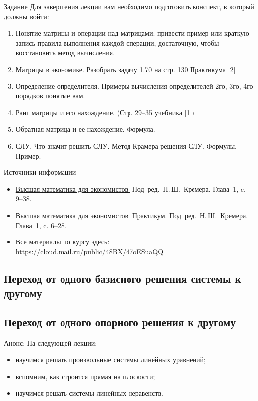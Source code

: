 \documentclass[unicode,11pt,notheorems]{beamer}
\begin{document}
\begin{frame}{Задание}
Для завершения лекции вам необходимо подготовить конспект, в который должны войти:
	\begin{enumerate}
		\item 
			Понятие матрицы и операции над матрицами: привести пример или краткую запись правила выполнения каждой операции, достаточную, чтобы восстановить метод вычисления.
		\item 
			Матрицы в экономике. Разобрать задачу 1.70 на стр. 130 Практикума [2]
		\item 
			Определение определителя. 
			Примеры вычисления определителей 2го, 3го, 4го порядков понятые вам. 
		\item 
			Ранг матрицы и его нахождение. (Стр. 29--35 учебника [1])
		\item 
			Обратная матрица и ее нахождение. Формула.
		\item 
			СЛУ. Что значит решить СЛУ. Метод Крамера решения СЛУ. Формулы. Пример.
	\end{enumerate}
\end{frame}
\begin{frame}{Источники информации}
\begin{itemize}
\item 
	{\color{blue}\href{https://cloud.mail.ru/public/jWCR/2BBwXTrkg}{Высшая математика для экономистов.}} Под~ред.~Н.\,Ш.~Кремера. Глава~1, c. 9--38.
\item 
	{\color{blue}\href{https://cloud.mail.ru/public/5c87/4Cmo8H9BA}{Высшая математика для экономистов. Практикум.}} Под~ред.~Н.\,Ш.~Кремера. Глава~1, c. 6--28.
	
\item 
	Все материалы по курсу здесь:
{\color{blue}\url{https://cloud.mail.ru/public/48BX/47oESuaQQ}}
\end{itemize}

\subsection{Переход от одного базисного  решения системы к другому}
\subsection{Переход от одного опорного решения  к другому}
\end{frame}

\begin{frame}{Анонс:}
	На следующей лекции:
	\begin{itemize}
	\item 
		научимся решать произвольные системы линейных уравнений;
	\item 
		вспомним, как строится прямая на плоскости;
	\item 
		научимся решать системы линейных неравенств.
	\end{itemize}

\end{frame}
\end{document}
